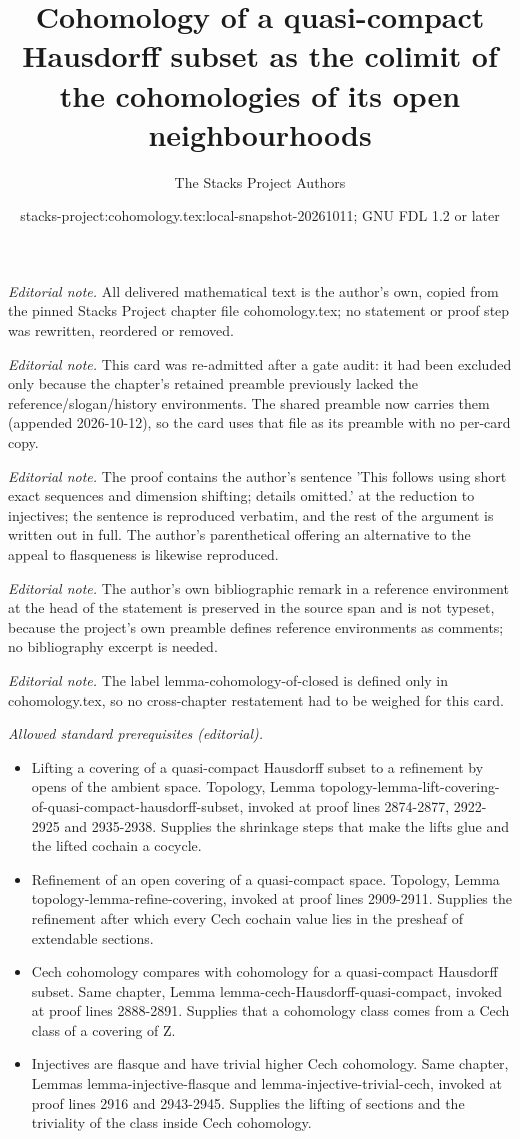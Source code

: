 \documentclass[10pt,a4paper]{amsart}
\title{Cohomology of a quasi-compact Hausdorff subset as the colimit of the cohomologies of its open neighbourhoods}
\author{The Stacks Project Authors}
\date{stacks-project:cohomology.tex:local-snapshot-20261011; GNU FDL 1.2 or later}
\theoremstyle{plain}
\theoremstyle{definition}
\theoremstyle{remark}
\numberwithin{equation}{subsection}
\begin{document}
\maketitle
\noindent\textit{Editorial note.} All delivered mathematical text is the author's own, copied from the pinned Stacks Project chapter file cohomology.tex; no statement or proof step was rewritten, reordered or removed.\par\medskip
\noindent\textit{Editorial note.} This card was re-admitted after a gate audit: it had been excluded only because the chapter's retained preamble previously lacked the reference/slogan/history environments. The shared preamble now carries them (appended 2026-10-12), so the card uses that file as its preamble with no per-card copy.\par\medskip
\noindent\textit{Editorial note.} The proof contains the author's sentence 'This follows using short exact sequences and dimension shifting; details omitted.' at the reduction to injectives; the sentence is reproduced verbatim, and the rest of the argument is written out in full. The author's parenthetical offering an alternative to the appeal to flasqueness is likewise reproduced.\par\medskip
\noindent\textit{Editorial note.} The author's own bibliographic remark in a reference environment at the head of the statement is preserved in the source span and is not typeset, because the project's own preamble defines reference environments as comments; no bibliography excerpt is needed.\par\medskip
\noindent\textit{Editorial note.} The label lemma-cohomology-of-closed is defined only in cohomology.tex, so no cross-chapter restatement had to be weighed for this card.\par\medskip
\noindent\textit{Allowed standard prerequisites (editorial).}\begin{itemize}
\item Lifting a covering of a quasi-compact Hausdorff subset to a refinement by opens of the ambient space. Topology, Lemma topology-lemma-lift-covering-of-quasi-compact-hausdorff-subset, invoked at proof lines 2874-2877, 2922-2925 and 2935-2938. Supplies the shrinkage steps that make the lifts glue and the lifted cochain a cocycle.
\item Refinement of an open covering of a quasi-compact space. Topology, Lemma topology-lemma-refine-covering, invoked at proof lines 2909-2911. Supplies the refinement after which every Cech cochain value lies in the presheaf of extendable sections.
\item Cech cohomology compares with cohomology for a quasi-compact Hausdorff subset. Same chapter, Lemma lemma-cech-Hausdorff-quasi-compact, invoked at proof lines 2888-2891. Supplies that a cohomology class comes from a Cech class of a covering of Z.
\item Injectives are flasque and have trivial higher Cech cohomology. Same chapter, Lemmas lemma-injective-flasque and lemma-injective-trivial-cech, invoked at proof lines 2916 and 2943-2945. Supplies the lifting of sections and the triviality of the class inside Cech cohomology.
\end{itemize}\medskip
\end{document}
